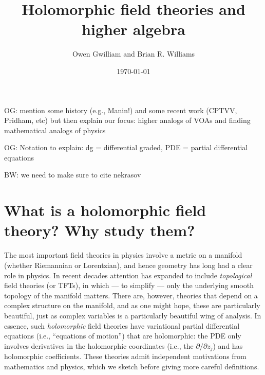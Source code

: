 \documentclass[11pt]{amsart}
\author{Owen Gwilliam and Brian R. Williams}
\date{\today}
\title{Holomorphic field theories and higher algebra}
\def\brian#1{{\textcolor{blue!65!red}{BW: {#1}}}}
\def\owen#1{{\textcolor{violet!65!black}{OG: {#1}}}}
\begin{document}

\maketitle
\tableofcontents

\owen{mention some history (e.g., Manin!) and some recent work (CPTVV, Pridham, etc) but then explain our focus: higher analogs of VOAs and finding mathematical analogs of physics}

\owen{Notation to explain: dg = differential graded, PDE = partial differential equations}

\brian{we need to make sure to cite nekrasov}


\section{What is a holomorphic field theory? Why study them?}

The most important field theories in physics involve a metric on a manifold (whether Riemannian or Lorentzian), and hence geometry has long had a clear role in physics.
In recent decades attention has expanded to include {\em topological} field theories (or TFTs), 
in which --- to simplify --- only the underlying smooth topology of the manifold matters.
There are, however, theories that depend on a complex structure on the manifold,
and as one might hope, these are particularly beautiful, 
just as complex variables is a particularly beautiful wing of analysis.
In essence, such {\em holomorphic} field theories have variational partial differential equations (i.e., ``equations of motion'') that are holomorphic:
the PDE only involves derivatives in the holomorphic coordinates (i.e., the $\partial/\partial z_j$) and has holomorphic coefficients.
These theories admit independent motivations from mathematics and physics,
which we sketch before giving more careful definitions.
\end{document}
